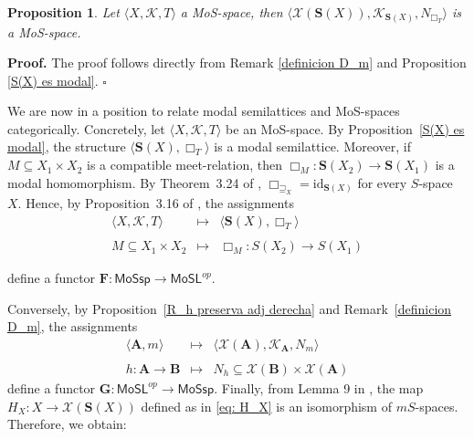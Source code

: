 \documentclass{article}
\newtheorem{proposition}{\bf Proposition}[section]
\newenvironment{proof}
{\par\noindent\textbf{Proof. }\rm}
{\hfill$\boldsymbol{\square}$\par\vspace{0.3cm}}
\begin{document}
\begin{proposition}\label{x(s(X)) es RS espacio}
    Let $\langle X,\mathcal{K},T\rangle$ a MoS-space, then $\langle\mathcal{X}(\mathbf{S}(X)),\mathcal{K}_{\mathbf{S}(X)}, N_{\Box_T}\rangle$ is a MoS-space.
\end{proposition}
\begin{proof}
    The proof follows directly from Remark \ref{definicion D_m} and Proposition \ref{S(X) es modal}.
\end{proof}

We are now in a position to relate modal semilattices and MoS-spaces categorically. Concretely, let $\langle X, \mathcal{K}, T \rangle$ be an MoS-space. By Proposition~\ref{S(X) es modal}, the structure $\langle \mathbf{S}(X), \Box_T \rangle$ is a modal semilattice. Moreover, if $M \subseteq X_1 \times X_2$ is a compatible meet-relation, then $\Box_M \colon \mathbf{S}(X_2) \to \mathbf{S}(X_1)$ is a modal homomorphism. By Theorem~3.24 of \cite{CG}, $\Box_{\sqsupseteq_X} = \mathrm{id}_{\mathbf{S}(X)}$ for every $S$-space $X$. Hence, by Proposition~3.16 of \cite{CG}, the assignments
\[
\begin{array}{ccl}
   \langle X, \mathcal{K}, T \rangle  & \mapsto & \langle \mathbf{S}(X), \Box_T \rangle \\ 
   \\
    M \subseteq X_1 \times X_2 & \mapsto &  \Box_M \colon S(X_2) \to S(X_1)
\end{array}
\]

define a functor $\mathbf{F} \colon \mathsf{MoSsp} \to \mathsf{MoSL}^{op}$.

Conversely, by Proposition~\ref{R_h preserva adj derecha} and Remark~\ref{definicion D_m}, the assignments
\[
\begin{array}{ccl}
\langle\mathbf{A},m\rangle & \mapsto & \langle \mathcal{X}(\mathbf{A}), \mathcal{K}_{\mathbf{A}}, N_m \rangle \\ \\
h \colon \mathbf{A} \to \mathbf{B} & \mapsto & N_h \subseteq \mathcal{X}(\mathbf{B}) \times \mathcal{X}(\mathbf{A})
\end{array}
\]
define a functor $\mathbf{G} \colon \mathsf{MoSL}^{op} \to \mathsf{MoSsp}$.
Finally, from Lemma 9 in \cite{P W}, the map $H_{X} : X \to \mathcal{X}(\mathbf{S}(X))$ defined as in \eqref{eq: H_X} is an isomorphism of $mS$-spaces. Therefore, we obtain:
\end{document}
